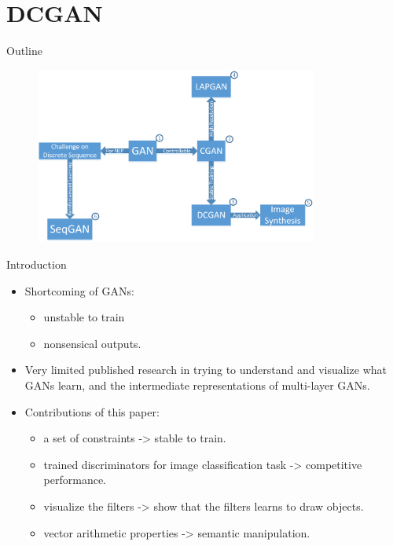 \documentclass[10pt]{beamer}
\newcommand{\subtitlepage}[3]{\title{#1}\subtitle{#2}\author{#3}\date{}\begin{frame}[plain]\titlepage\end{frame}}
\begin{document}
	\part{DCGAN}
	\begin{frame}{Outline}
		\begin{figure}
			\includegraphics[width=25em]{figures/outline.png}
		\end{figure}
	\end{frame}
	\subtitlepage{}{Unsupervised Representation Learning with Deep Convolutional Generative Adversarial Networks}{Alec Radford, Luke Metz, Soumith Chintala\\arXiv: 1511.06434}
	\begin{frame}{Introduction}
		\begin{itemize}
			\item Shortcoming of GANs:
			\begin{itemize}
				\pause
				\item unstable to train
				\item nonsensical outputs.
			\end{itemize}
			\pause
			\item Very limited published research in trying to understand and visualize what GANs learn, and the intermediate representations of multi-layer GANs.
			\pause
			\item Contributions of this paper:
			\begin{itemize}
				\pause
				\item a set of constraints -> stable to train.
				\pause
				\item trained discriminators for image classification task -> competitive performance.
				\pause
				\item visualize the filters -> show that the filters learns to draw objects.
				\pause
				\item vector arithmetic properties -> semantic manipulation.
				\pause
			\end{itemize}
		\end{itemize}
	\end{frame}
\end{document}
